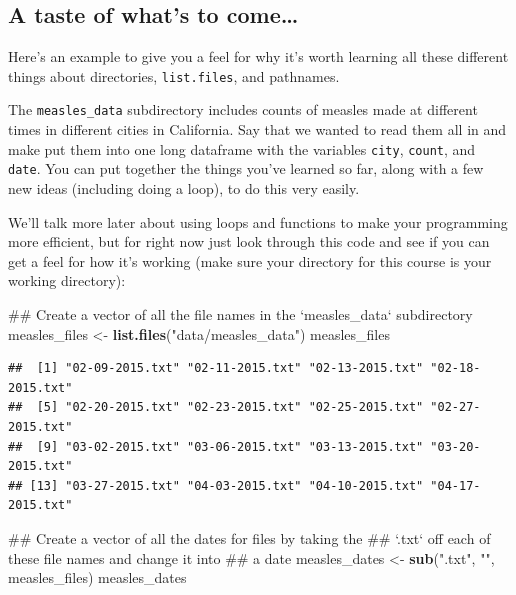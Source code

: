 \documentclass[]{book}
\makeatletter
\newenvironment{Shaded}{\begin{snugshade}}{\end{snugshade}}
\newcommand{\KeywordTok}[1]{\textcolor[rgb]{0.13,0.29,0.53}{\textbf{#1}}}
\newcommand{\StringTok}[1]{\textcolor[rgb]{0.31,0.60,0.02}{#1}}
\newcommand{\NormalTok}[1]{#1}
\newenvironment{kframe}{%
\medskip{}
\setlength{\fboxsep}{.8em}
 \def\at@end@of@kframe{}%
 \ifinner\ifhmode%
  \def\at@end@of@kframe{\end{minipage}}%
  \begin{minipage}{\columnwidth}%
 \fi\fi%
 \def\FrameCommand##1{\hskip\@totalleftmargin \hskip-\fboxsep
 \colorbox{shadecolor}{##1}\hskip-\fboxsep
     \hskip-\linewidth \hskip-\@totalleftmargin \hskip\columnwidth}%
 \MakeFramed {\advance\hsize-\width
   \@totalleftmargin\z@ \linewidth\hsize
   \@setminipage}}%
 {\par\unskip\endMakeFramed%
 \at@end@of@kframe}
\renewenvironment{Shaded}{\begin{kframe}}{\end{kframe}}
\theoremstyle{definition}
\theoremstyle{definition}
\theoremstyle{definition}
\theoremstyle{remark}
\makeatother
\begin{document}
\subsection{A taste of what's to
come\ldots{}}\label{a-taste-of-whats-to-come}

Here's an example to give you a feel for why it's worth learning all
these different things about directories, \texttt{list.files}, and
pathnames.

The \texttt{measles\_data} subdirectory includes counts of measles made
at different times in different cities in California. Say that we wanted
to read them all in and make put them into one long dataframe with the
variables \texttt{city}, \texttt{count}, and \texttt{date}. You can put
together the things you've learned so far, along with a few new ideas
(including doing a loop), to do this very easily.

We'll talk more later about using loops and functions to make your
programming more efficient, but for right now just look through this
code and see if you can get a feel for how it's working (make sure your
directory for this course is your working directory):

\begin{Shaded}
\begin{Highlighting}[]
\NormalTok{## Create a vector of all the file names in the `measles_data` subdirectory}
\NormalTok{measles_files <-}\StringTok{ }\KeywordTok{list.files}\NormalTok{(}\StringTok{"data/measles_data"}\NormalTok{)}
\NormalTok{measles_files}
\end{Highlighting}
\end{Shaded}

\begin{verbatim}
##  [1] "02-09-2015.txt" "02-11-2015.txt" "02-13-2015.txt" "02-18-2015.txt"
##  [5] "02-20-2015.txt" "02-23-2015.txt" "02-25-2015.txt" "02-27-2015.txt"
##  [9] "03-02-2015.txt" "03-06-2015.txt" "03-13-2015.txt" "03-20-2015.txt"
## [13] "03-27-2015.txt" "04-03-2015.txt" "04-10-2015.txt" "04-17-2015.txt"
\end{verbatim}

\begin{Shaded}
\begin{Highlighting}[]
\NormalTok{## Create a vector of all the dates for files by taking the }
\NormalTok{## `.txt` off each of these file names and change it into}
\NormalTok{## a date}
\NormalTok{measles_dates <-}\StringTok{ }\KeywordTok{sub}\NormalTok{(}\StringTok{".txt"}\NormalTok{, }\StringTok{""}\NormalTok{, measles_files)}
\NormalTok{measles_dates}
\end{Highlighting}
\end{Shaded}
\end{document}
